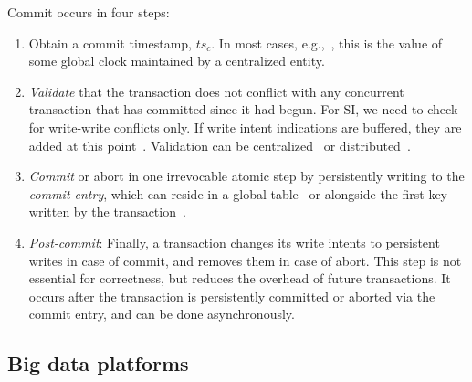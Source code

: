 {%

  Commit occurs in four steps: \vspace{-0.3cm}
  \begin{enumerate}
    \setlength{\itemsep}{0pt}
    \setlength{\parskip}{0pt}
    \setlength{\parsep}{2pt}  
  \item
  Obtain a commit timestamp, $ts_c$. 
  In most cases, e.g.,~\cite{Percolator2010,OmidICDE2014,Omid2017,tephra}, 
  this is the value of some global clock maintained by a centralized entity. 
  \item \emph{Validate} that the transaction does not conflict with any concurrent transaction that has committed since it 
had begun.  For SI, we need to check for write-write conflicts only. 
If write intent indications are buffered, they are added at this point~\cite{Percolator2010}.
Validation can be centralized~\cite{OmidICDE2014,Omid2017,tephra} or distributed~\cite{Percolator2010,cockroach}. 


\item \emph{Commit} or abort in one  irrevocable atomic step by persistently writing to the \emph{commit entry}, 
  which can reside in a global table~\cite{Omid2017,cockroach} or alongside the first  key written by 
  the transaction~\cite{Percolator2010}.  
  
 \item \emph{Post-commit}: 
  Finally, a transaction changes its write intents to
  persistent writes in case of commit, and removes them in case of abort. This
  step is not essential for correctness, but reduces the overhead of future transactions. It
  occurs after the transaction is persistently committed or aborted via the commit entry, 
  and can be done asynchronously.
 \end{enumerate}
 

\subsection{Big data platforms}
\label{ssec:bigdata}

}
